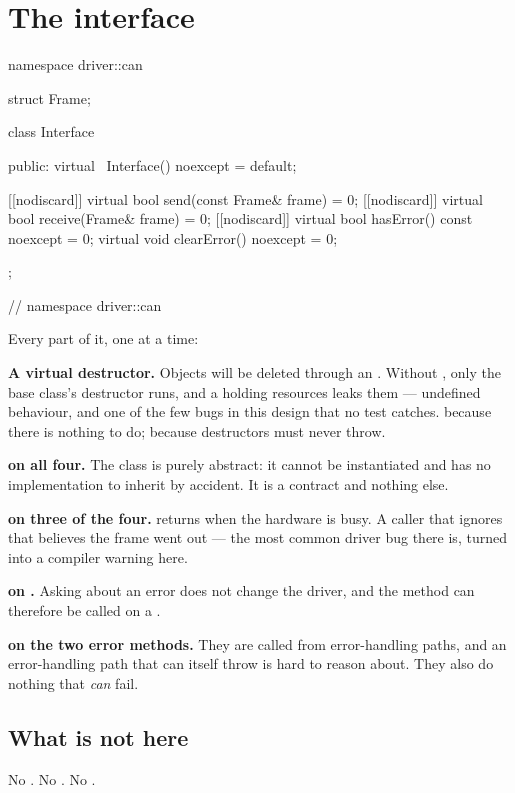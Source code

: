\section{The interface}
\label{sec:interface}

\begin{cppcode}
namespace driver::can
{
struct Frame;

class Interface
{
public:
    virtual ~Interface() noexcept = default;

    [[nodiscard]] virtual bool send(const Frame& frame)      = 0;
    [[nodiscard]] virtual bool receive(Frame& frame)         = 0;
    [[nodiscard]] virtual bool hasError() const noexcept     = 0;
    virtual void clearError() noexcept                       = 0;
};
} // namespace driver::can
\end{cppcode}

Every part of it, one at a time:

\textbf{A virtual destructor.} Objects will be deleted through an . Without
, only the base class's destructor runs, and a  holding resources leaks
them --- undefined behaviour, and one of the few bugs in this design that no test catches.
 because there is nothing to do;  because destructors must never
throw.

\textbf{ on all four.} The class is purely abstract: it cannot be instantiated and has
no implementation to inherit by accident. It is a contract and nothing else.

\textbf{\code{[[nodiscard]]} on three of the four.}  returns  when the
hardware is busy. A caller that ignores that believes the frame went out --- the most common
driver bug there is, turned into a compiler warning here.

\textbf{ on .} Asking about an error does not change the driver, and
the method can therefore be called on a .

\textbf{ on the two error methods.} They are called from error-handling paths, and
an error-handling path that can itself throw is hard to reason about. They also do nothing that
\emph{can} fail.

\subsection{What is not here}

No . No . No .

